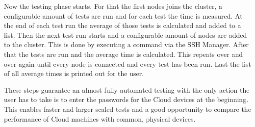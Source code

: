 Now the testing phase starts. For that the first nodes joins the cluster, a configurable amount of tests are run and for each test the time is measured. At the end of each test run the average of those tests is calculated and added to a list. Then the next test run starts and a configurable amount of nodes are added to the cluster. This is done by executing a command via the SSH Manager. After that the tests are run and the average time is calculated. This repeats over and over again until every node is connected and every test has been run. Last the list of all average times is printed out for the user.

These steps guarantee an almost fully automated testing with the only action the user has to take is to enter the passwords for the Cloud devices at the beginning. This enables faster and larger scaled tests and a good opportunity to compare the performance of Cloud machines with common, physical devices.
